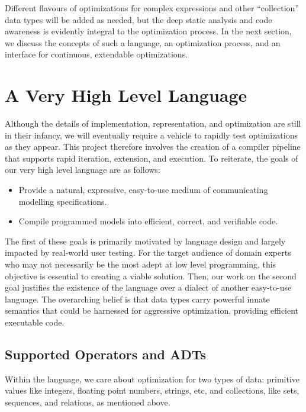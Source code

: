 \documentclass{article}
\begin{document}
Different flavours of optimizations for complex expressions and other ``collection'' data types will be added as needed, but the deep static analysis and code awareness is evidently integral to the optimization process. In the next section, we discuss the concepts of such a language, an optimization process, and an interface for continuous, extendable optimizations.

\section{A Very High Level Language}

Although the details of implementation, representation, and optimization are still in their infancy, we will eventually require a vehicle to rapidly test optimizations as they appear. This project therefore involves the creation of a compiler pipeline that supports rapid iteration, extension, and execution. To reiterate, the goals of our very high level language are as follows:
\begin{itemize}
  \item Provide a natural, expressive, easy-to-use medium of communicating modelling specifications.
  \item Compile programmed models into efficient, correct, and verifiable code.
\end{itemize}
The first of these goals is primarily motivated by language design and largely impacted by real-world user testing. For the target audience of domain experts who may not necessarily be the most adept at low level programming, this objective is essential to creating a viable solution. Then, our work on the second goal justifies the existence of the language over a dialect of another easy-to-use language. The overarching belief is that data types carry powerful innate semantics that could be harnessed for aggressive optimization, providing efficient executable code.

\subsection{Supported Operators and ADTs}
Within the language, we care about optimization for two types of data: primitive values like integers, floating point numbers, strings, etc, and collections, like sets, sequences, and relations, as mentioned above.
\end{document}
